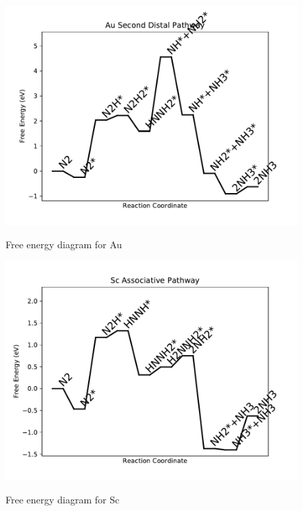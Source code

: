 \documentclass[journal=jacsat,manuscript=article]{achemso}
\begin{document}
\begin{figure}
\includegraphics[width=1\linewidth]{data/plots/Au_distal_2.pdf}
\label{fig:Au_distal_2}
\caption{Free energy diagram for Au}
\end{figure}

\newpage
\begin{figure}
\includegraphics[width=1\linewidth]{data/plots/Sc_associative.pdf}
\label{fig:Sc_associative}
\caption{Free energy diagram for Sc}
\end{figure}
\end{document}
